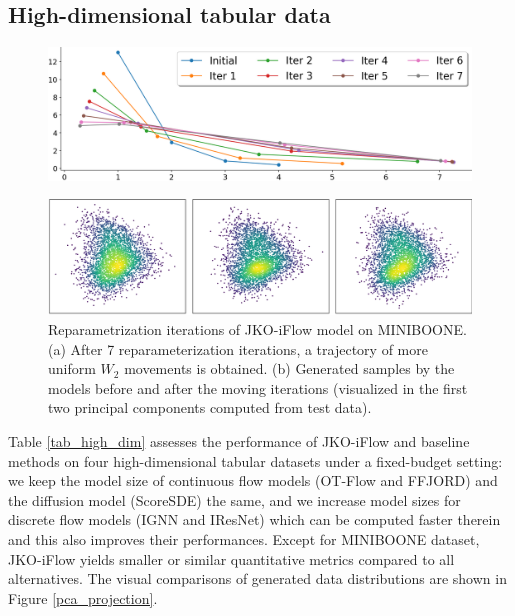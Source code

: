 \documentclass{article}
\theoremstyle{remark}
\theoremstyle{plain}
\newcommand{\JKO}{JKO-iFlow}
\newcommand{\revold}[1]{{\color{black}#1}}
\begin{document}
{\subsection{High-dimensional tabular data}
\begin{figure}[!b]
    \begin{minipage}[b]{0.48\textwidth}
    \includegraphics[width=\textwidth]{miniboon_reparam_W2.png}
    \label{fig_reparam}
    \end{minipage}
    \hfill
    \begin{minipage}[b]{0.51\textwidth}
    \includegraphics[width=\textwidth]{miniboone_true_vs_gen_together.png}
    \end{minipage}
    \vspace{-0.05in}
    \caption{
    Reparametrization iterations of \JKO{} model on MINIBOONE.
    (a) After 7 reparameterization iterations, a trajectory of more uniform $W_2$ movements is obtained. 
    (b) Generated samples by the models before and after the moving iterations (visualized in the first two principal components computed from test data).
    }
    \label{fig_MINIBOONE_sub_reparam}
\end{figure}

Table \ref{tab_high_dim} assesses the performance of \JKO{} and baseline methods on four high-dimensional tabular datasets under a fixed-budget setting:
we keep the model size of continuous flow models (OT-Flow and FFJORD) and the diffusion model (ScoreSDE) the same, 
and we increase model sizes for discrete flow models (IGNN and IResNet) which can be 
%
computed faster therein and this also improves their performances.
%
Except for \revold{MINIBOONE} dataset, \JKO{} yields smaller or similar \revold{quantitative} metrics compared to all alternatives. 
%
The visual comparisons of generated data distributions %
are shown in Figure \ref{pca_projection}. 
%


}
\end{document}
